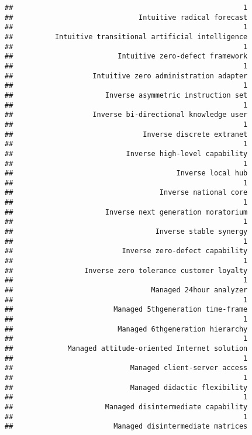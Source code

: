 \documentclass[
]{article}
\begin{document}
\begin{verbatim}
##                                                       1 
##                              Intuitive radical forecast 
##                                                       1 
##          Intuitive transitional artificial intelligence 
##                                                       1 
##                         Intuitive zero-defect framework 
##                                                       1 
##                   Intuitive zero administration adapter 
##                                                       1 
##                      Inverse asymmetric instruction set 
##                                                       1 
##                   Inverse bi-directional knowledge user 
##                                                       1 
##                               Inverse discrete extranet 
##                                                       1 
##                           Inverse high-level capability 
##                                                       1 
##                                       Inverse local hub 
##                                                       1 
##                                   Inverse national core 
##                                                       1 
##                      Inverse next generation moratorium 
##                                                       1 
##                                  Inverse stable synergy 
##                                                       1 
##                          Inverse zero-defect capability 
##                                                       1 
##                 Inverse zero tolerance customer loyalty 
##                                                       1 
##                                 Managed 24hour analyzer 
##                                                       1 
##                        Managed 5thgeneration time-frame 
##                                                       1 
##                         Managed 6thgeneration hierarchy 
##                                                       1 
##             Managed attitude-oriented Internet solution 
##                                                       1 
##                            Managed client-server access 
##                                                       1 
##                            Managed didactic flexibility 
##                                                       1 
##                      Managed disintermediate capability 
##                                                       1 
##                        Managed disintermediate matrices 

\end{verbatim}
\end{document}
